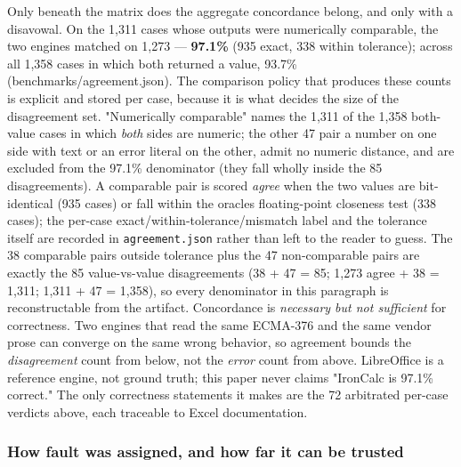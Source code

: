 \documentclass[
]{article}
\begin{document}
Only beneath the matrix does the aggregate concordance belong, and only
with a disavowal. On the 1,311 cases whose outputs were numerically
comparable, the two engines matched on 1,273 --- \textbf{97.1\%} (935
exact, 338 within tolerance); across all 1,358 cases in which both
returned a value, 93.7\% (benchmarks/agreement.json). The comparison
policy that produces these counts is explicit and stored per case,
because it is what decides the size of the disagreement set.
"Numerically comparable" names the 1,311 of the 1,358 both-value cases
in which \emph{both} sides are numeric; the other 47 pair a number on
one side with text or an error literal on the other, admit no numeric
distance, and are excluded from the 97.1\% denominator (they fall wholly
inside the 85 disagreements). A comparable pair is scored \emph{agree}
when the two values are bit-identical (935 cases) or fall within the
oracle\textquotesingle s floating-point closeness test (338 cases); the
per-case exact/within-tolerance/mismatch label and the tolerance itself
are recorded in \texttt{agreement.json} rather than left to the reader
to guess. The 38 comparable pairs outside tolerance plus the 47
non-comparable pairs are exactly the 85 value-vs-value disagreements (38
+ 47 = 85; 1,273 agree + 38 = 1,311; 1,311 + 47 = 1,358), so every
denominator in this paragraph is reconstructable from the artifact.
Concordance is \emph{necessary but not sufficient} for correctness. Two
engines that read the same ECMA-376 and the same vendor prose can
converge on the same wrong behavior, so agreement bounds the
\emph{disagreement} count from below, not the \emph{error} count from
above. LibreOffice is a reference engine, not ground truth; this paper
never claims "IronCalc is 97.1\% correct." The only correctness
statements it makes are the 72 arbitrated per-case verdicts above, each
traceable to Excel documentation.

\subsubsection{How fault was assigned, and how far it can be
trusted}\label{how-fault-was-assigned-and-how-far-it-can-be-trusted}
\end{document}
